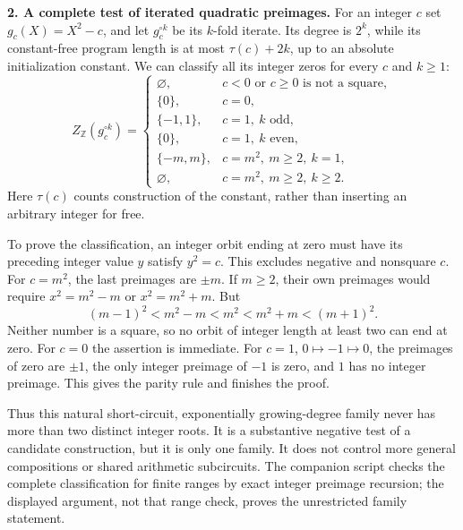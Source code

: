 \documentclass[11pt,a4paper]{article}
\newcommand{\Z}{\mathbb{Z}}
\numberwithin{equation}{section}
\begin{document}
\textbf{2. A complete test of iterated quadratic preimages.}
For an integer $c$ set $g_c(X)=X^2-c$, and let $g_c^{\circ k}$ be its
$k$-fold iterate. Its degree is $2^k$, while its constant-free program
length is at most $\tau(c)+2k$, up to an absolute initialization constant.
We can classify all its integer zeros for every $c$ and $k\ge1$:
\begin{equation}\label{20002353:iterate}
 Z_{\Z}(g_c^{\circ k})=
 \begin{cases}
 \varnothing,&c<0\text{ or }c\ge0\text{ is not a square},\\
 \{0\},&c=0,\\
 \{-1,1\},&c=1,\ k\text{ odd},\\
 \{0\},&c=1,\ k\text{ even},\\
 \{-m,m\},&c=m^2,\ m\ge2,\ k=1,\\
 \varnothing,&c=m^2,\ m\ge2,\ k\ge2.
 \end{cases}
\end{equation}
Here $\tau(c)$ counts construction of the constant, rather than inserting
an arbitrary integer for free.

To prove the classification, an integer orbit ending at zero must have
its preceding integer value $y$ satisfy $y^2=c$. This excludes negative
and nonsquare $c$. For $c=m^2$, the last preimages are $\pm m$.
If $m\ge2$, their own preimages would require
$x^2=m^2-m$ or $x^2=m^2+m$. But
\[
 (m-1)^2<m^2-m<m^2<m^2+m<(m+1)^2.
\]
Neither number is a square, so no orbit of integer length at least two
can end at zero. For $c=0$ the assertion is immediate. For $c=1$,
$0\mapsto-1\mapsto0$, the preimages of zero are $\pm1$, the only
integer preimage of $-1$ is zero, and $1$ has no integer preimage.
This gives the parity rule and finishes the proof.

Thus this natural short-circuit, exponentially growing-degree family
never has more than two distinct integer roots. It is a substantive
negative test of a candidate construction, but it is only one family.
It does not control more general compositions or shared arithmetic
subcircuits. The companion script checks the complete classification
for finite ranges by exact integer preimage recursion; the displayed
argument, not that range check, proves the unrestricted family statement.
\end{document}
